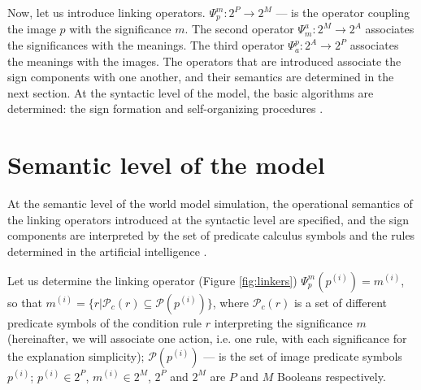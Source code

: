 \documentclass[review]{elsarticle}
\begin{document}
Now, let us introduce linking operators. $\Psi_p^m:2^P\rightarrow 2^M$ --- is the operator coupling the image $p$ with the significance $m$. The second operator $\Psi_m^a:2^M\rightarrow 2^A$ associates the significances with the meanings. The third operator $\Psi_a^p: 2^A\rightarrow 2^P$ associates the meanings with the images. The operators that are introduced associate the sign components with one another, and their semantics are determined in the next section. At the syntactic level of the  model, the basic algorithms are determined: the sign formation and self-organizing procedures \cite{Osipov2014c}.

\section{Semantic level of the model}\label{sec:semantic}

At the semantic level of the world model simulation, the operational semantics of the linking operators introduced at the syntactic level are specified, and the sign components are interpreted by the set of predicate calculus symbols and the rules determined in the artificial intelligence \cite{Osipov2015c,Osipov2016a}.

Let us determine the linking operator (Figure \ref{fig:linkers}) $\Psi_p^m(p^{(i)})=m^{(i)}$, so that $m^{(i)}=\{r|\mathcal{P}_c(r)\subseteq \mathcal{P}(p^{(i)})\}$, where $\mathcal{P}_c(r)$ is a set of different predicate symbols of the condition rule $r$ interpreting the significance $m$ (hereinafter, we will associate one action, i.e. one rule, with each significance for the explanation simplicity); $\mathcal{P}(p^{(i)})$ --- is the set of image predicate symbols $p^{(i)}$; $p^{(i)}\in 2^P$, $m^{(i)}\in 2^M$, $2^P$ and $2^M$ are $P$ and $M$ Booleans respectively.
\end{document}
